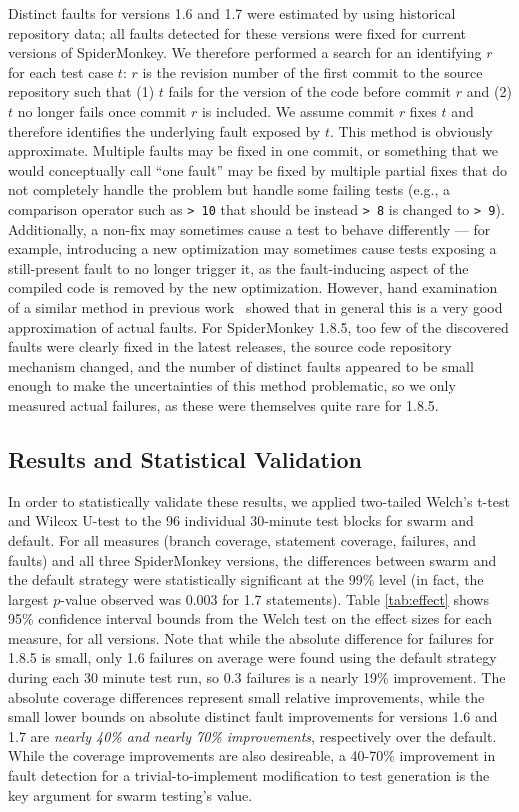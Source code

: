 Distinct faults for versions 1.6 and 1.7 were estimated by using
historical repository data; all faults detected for these versions
were fixed for current versions of SpiderMonkey.  We therefore
performed a search for an identifying $r$ for each test case $t$: $r$
is the revision number of the first commit to the source repository
such that (1) $t$ fails for the version of the code before commit $r$
and (2) $t$ no longer fails once commit $r$ is included.  We assume
commit $r$ fixes $t$ and therefore identifies the underlying fault
exposed by $t$.  This method is obviously approximate. Multiple faults
may be fixed in one commit, or something that we would conceptually
call ``one fault'' may be fixed by multiple partial fixes that do not
completely handle the problem but handle some failing tests (e.g., a
comparison operator such as {\tt > 10} that should be instead {\tt >
8} is changed to {\tt > 9}).  Additionally, a non-fix may sometimes
cause a test to behave differently --- for example, introducing a new
optimization may sometimes cause tests exposing a still-present fault
to no longer trigger it, as the fault-inducing aspect of the compiled
code is removed by the new optimization.  However, hand examination of
a similar method in previous work~\cite{PLDI13} showed that in general
this is a very good approximation of actual faults.  For SpiderMonkey
1.8.5, too few of the discovered faults were clearly fixed in the
latest releases, the source code repository mechanism changed, and the
number of distinct faults appeared to be small enough to make the
uncertainties of this method problematic, so we only measured actual
failures, as these were themselves quite rare for 1.8.5.

\subsection{Results and Statistical Validation}

In order to statistically validate these results, we applied
two-tailed Welch's t-test and Wilcox U-test to the 96 individual
30-minute test blocks for swarm and default.  For all measures (branch
coverage, statement coverage, failures, and faults) and all three
SpiderMonkey versions, the differences between swarm and the default
strategy were statistically significant at the 99\% level (in fact,
the largest $p$-value observed was 0.003 for 1.7 statements).  Table
\ref{tab:effect} shows 95\% confidence interval bounds from the Welch
test on the effect sizes for each measure, for all versions.  Note
that while the absolute difference for failures for 1.8.5 is small,
only 1.6 failures on average were found using the default strategy
during each 30 minute test run, so 0.3 failures is a nearly 19\%
improvement.  The absolute coverage differences represent small
relative improvements, while the small lower bounds on absolute
distinct fault improvements for versions 1.6 and 1.7 are \emph{nearly
40\% and nearly 70\% improvements}, respectively over the default.
While the coverage improvements are also desireable, a 40-70\%
improvement in fault detection for a trivial-to-implement modification
to test generation is the key argument for swarm testing's value.

